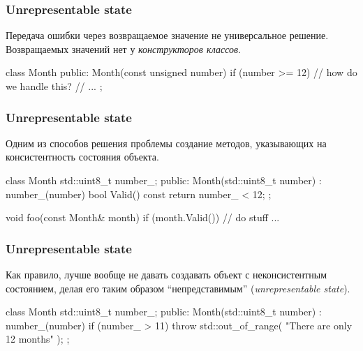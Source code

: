 \documentclass[compress, 8pt, aspectratio=169]{beamer}
\begin{document}
  \begin{frame}[fragile]

    \frametitle{Unrepresentable state}

    Передача ошибки через возвращаемое значение \textemdash \space
    не универсальное решение.
    Возвращаемых значений нет у \textit{конструкторов классов}.

    \begin{myinplacelisting}[minted language=cpp]
class Month {
public:
    Month(const unsigned number) {
        if (number >= 12) {
            // how do we handle this?
        }
    }
    // ...
};
    \end{myinplacelisting}

  \end{frame}

  \begin{frame}[fragile]

    \frametitle{Unrepresentable state}

    Одним из способов решения проблемы \textemdash \space
    создание методов, указывающих на консистентность
    состояния объекта.

    \begin{myinplacelisting}[minted language=cpp]
class Month {
    std::uint8_t number_;
public:
    Month(std::uint8_t number) :
        number_(number) {}
    bool Valid() const {
        return number_ < 12;
    }
};

void foo(const Month& month) {
    if (month.Valid()) {
        // do stuff ...
    }
}
    \end{myinplacelisting}

  \end{frame}

  \begin{frame}[fragile]

    \frametitle{Unrepresentable state}

    Как правило, лучше вообще не давать создавать объект с
    неконсистентным состоянием, делая его таким образом
    \enquote{непредставимым} (\textit{unrepresentable state}).

    \begin{myinplacelisting}[minted language=cpp]
class Month {
    std::uint8_t number_;
public:
    Month(std::uint8_t number) : number_(number) {
        if (number_ > 11) {
            throw std::out_of_range(
                "There are only 12 months"
            );
        }
    }
};
    \end{myinplacelisting}

  \end{frame}
\end{document}
